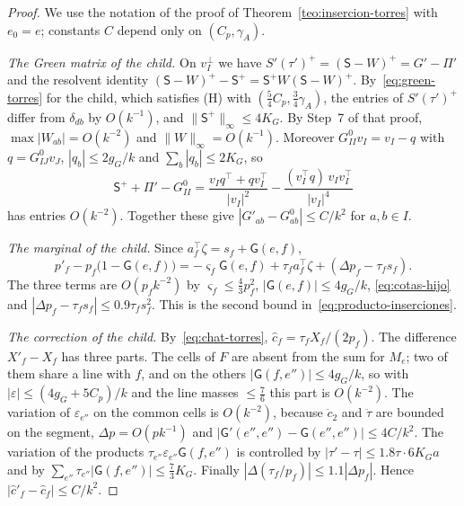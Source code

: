 \begin{proof}
We use the notation of the proof of Theorem~\ref{teo:insercion-torres} with $e_0=e$; constants $C$ depend
only on $(C_p,\gamma_A)$.

\emph{The Green matrix of the child.} On $v_I^\perp$ we have $S'(\tau')^+=(\mathsf S-W)^+=G'-\Pi'$ and
the resolvent identity $(\mathsf S-W)^+-\mathsf S^+=\mathsf S^+W(\mathsf S-W)^+$.
By~\eqref{eq:green-torres} for the child, which satisfies \textup{(H)} with
$(\tfrac54C_p,\tfrac34\gamma_A)$, the entries of $S'(\tau')^+$ differ from $\delta_{db}$ by $O(k^{-1})$,
and $\|\mathsf S^+\|_\infty\le4K_G$. By Step~7 of that proof, $\max|W_{ab}|=O(k^{-2})$ and
$\|W\|_\infty=O(k^{-1})$. Moreover $G^0_{II}v_I=v_I-q$ with $q=G^0_{IJ}v_J$, $|q_b|\le2g_G/k$ and
$\sum_b|q_b|\le2K_G$, so
\[
 \mathsf S^++\Pi'-G^0_{II}=\frac{v_Iq^\top+qv_I^\top}{|v_I|^2}-\frac{(v_I^\top q)\,v_Iv_I^\top}{|v_I|^4}
\]
has entries $O(k^{-2})$. Together these give $|G'_{ab}-G^0_{ab}|\le C/k^2$ for $a,b\in I$.

\emph{The marginal of the child.} Since $a_f^\top\zeta=s_f+\mathsf G(e,f)$,
\[
 p'_f-p_f\bigl(1-\mathsf G(e,f)\bigr)=-\varsigma_f\mathsf G(e,f)+\tau_fa_f^\top\zeta
   +(\Delta p_f-\tau_fs_f).
\]
The three terms are $O(p_fk^{-2})$ by $\varsigma_f\le\tfrac43p_f^2$, $|\mathsf G(e,f)|\le4g_G/k$,
\eqref{eq:cotas-hijo} and $|\Delta p_f-\tau_fs_f|\le0.9\tau_fs_f^2$. This is the second bound
in~\eqref{eq:producto-inserciones}.

\emph{The correction of the child.} By~\eqref{eq:chat-torres}, $\hat c_f=\tau_fX_f/(2p_f)$. The difference
$X'_f-X_f$ has three parts. The cells of $F$ are absent from the sum for $M_e$; two of them share a line
with $f$, and on the others $|\mathsf G(f,e'')|\le4g_G/k$, so with $|\varepsilon|\le(4g_G+5C_p)/k$ and the
line masses $\le\tfrac76$ this part is $O(k^{-2})$. The variation of $\varepsilon_{e''}$ on the common
cells is $O(k^{-2})$, because $\ddot c_2$ and $\ddot\tau$ are bounded on the segment, $\Delta p=O(pk^{-1})$
and
$|\mathsf G'(e'',e'')-\mathsf G(e'',e'')|\le4C/k^2$. The variation of the products
$\tau_{e''}\varepsilon_{e''}\mathsf G(f,e'')$ is controlled by $|\tau'-\tau|\le1.8\tau\cdot6K_Ga$ and by
$\sum_{e''}\tau_{e''}|\mathsf G(f,e'')|\le\tfrac73K_G$. Finally $|\Delta(\tau_f/p_f)|\le1.1|\Delta p_f|$.
Hence $|\hat c'_f-\hat c_f|\le C/k^2$.


\end{proof}
